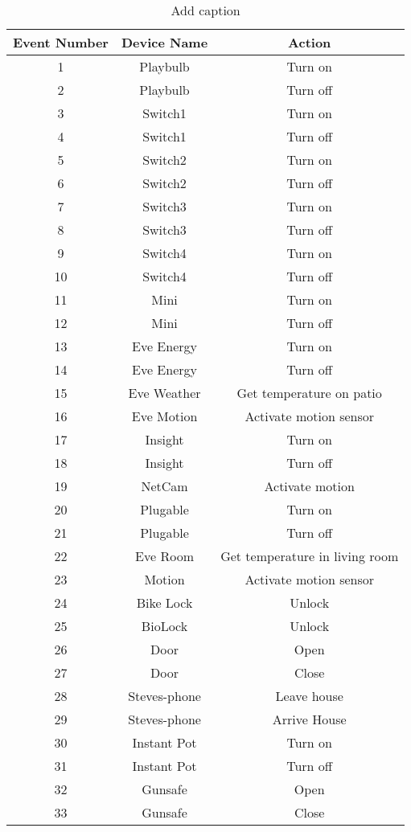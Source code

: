\begin{table}[h!]
\centering
\caption{Add caption}
	\color{red}
	\begin{tabular}{|c|c|c|}
		\hline
		﻿Event Number & Device Name & Action \\
		\hline
		1 & Playbulb & Turn on \\
		\hline
		2 & Playbulb & Turn off \\
		\hline
		3 & Switch1 & Turn on \\
		\hline
		4 & Switch1 & Turn off \\
		\hline
		5 & Switch2 & Turn on \\
		\hline
		6 & Switch2 & Turn off \\
		\hline
		7 & Switch3 & Turn on \\
		\hline
		8 & Switch3 & Turn off \\
		\hline
		9 & Switch4 & Turn on \\
		\hline
		10 & Switch4 & Turn off \\
		\hline
		11 & Mini & Turn on \\
		\hline
		12 & Mini & Turn off \\
		\hline
		13 & Eve Energy & Turn on \\
		\hline
		14 & Eve Energy & Turn off \\
		\hline
		15 & Eve Weather & Get temperature on patio \\
		\hline
		16 & Eve Motion & Activate motion sensor \\
		\hline
		17 & Insight & Turn on \\
		\hline
		18 & Insight & Turn off \\
		\hline
		19 & NetCam & Activate motion \\
		\hline
		20 & Plugable & Turn on \\
		\hline
		21 & Plugable & Turn off \\
		\hline
		22 & Eve Room & Get temperature in living room \\
		\hline
		23 & Motion & Activate motion sensor \\
		\hline
		24 & Bike Lock & Unlock \\
		\hline
		25 & BioLock & Unlock \\
		\hline
		26 & Door & Open \\
		\hline
		27 & Door & Close \\
		\hline
		28 & Steves-phone & Leave house \\
		\hline
		29 & Steves-phone & Arrive House \\
		\hline
		30 & Instant Pot & Turn on \\
		\hline
		31 & Instant Pot & Turn off \\
		\hline
		32 & Gunsafe  & Open \\
		\hline
		33 & Gunsafe  & Close \\
		\hline
	\end{tabular}
\label{addlabel}
\end{table}